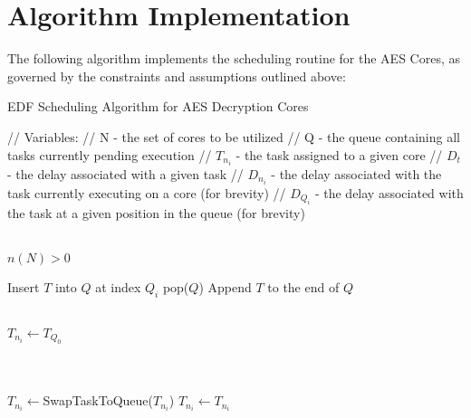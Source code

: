 \section{Algorithm Implementation}\label{sec:AlgoImpl}
The following algorithm implements the scheduling routine for the AES Cores, as governed by the constraints and assumptions outlined above:
\begin{algorithm}
    \caption{EDF Scheduling Algorithm for AES Decryption Cores}\label{alg:EDFAES}
    \begin{algorithmic}


        \State // Variables: 
        \State // N - the set of cores to be utilized
        \State // Q - the queue containing all tasks currently pending execution
        \State // $T_{n_i}$ - the task assigned to a given core
        \State // $D_t$ - the delay associated with a given task
        \State // $D_{n_i}$ - the delay associated with the task currently executing on a core (for brevity)
        \State // $D_{Q_i}$ - the delay associated with the task at a given position in the queue (for brevity)

        \\

        \Require $n(N) > 0$ 

                    \State Insert $T$ into $Q$ at index $Q_i$
                    \State \Return pop($Q$)
                \EndIf
            \EndFor
            \State Append $T$ to the end of $Q$ 
        \EndFunction

        \\

         
                        \State $T_{n_i} \gets T_{Q_0}$ 

                    \\
                    \State {}
                    \\

                        \State $T_{n_i} \gets $SwapTaskToQueue($T_{n_i}$)
                    \Else
                        \State $T_{n_i} \gets T_{n_i}$
                    \EndIf
                \EndIf
            \EndFor
        \EndWhile
    \end{algorithmic}
\end{algorithm}